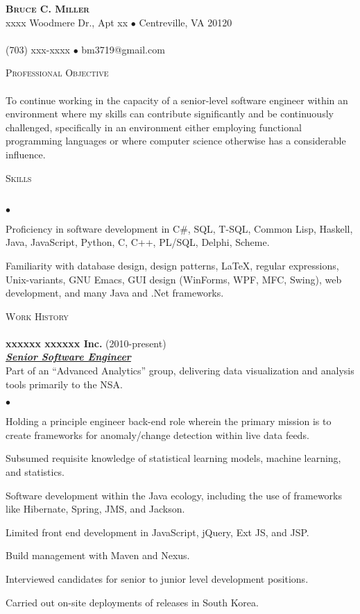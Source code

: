 \documentclass{article}
\newcommand{\lineunder}{\vspace*{-8pt} \\ \hspace*{-18pt} \hrulefill \\}
\newcommand{\header}[1]{{\hspace*{-15pt}\vspace*{7pt} \textsc{#1}} \vspace*{-7pt} \lineunder}
\newcommand{\employer}[3]{{ \textbf{#1} (#2)\\ \underline{\textbf{\emph{#3}}}\\  }}
\newcommand{\contact}[3]{
\vspace*{-8pt}
\begin{center}
{\LARGE \scshape {#1}}\\
#2 \lineunder
#3
\end{center}
\vspace*{-8pt}
}
\newenvironment{achievements}{\begin{list}{$\bullet$}{\topsep 0pt \itemsep
      -2pt}}{\vspace*{4pt}\end{list}}
\begin{document}
\small
\smallskip
\vspace*{-44pt}

\contact{\textbf{Bruce C. Miller}}
{xxxx Woodmere Dr., Apt xx $\bullet$ Centreville, VA 20120}
{(703) xxx-xxxx $\bullet$ bm3719@gmail.com}

\header{Professional Objective} To continue working in the capacity of a
senior-level software engineer within an environment where my skills can
contribute significantly and be continuously challenged, specifically in an
environment either employing functional programming languages or where computer
science otherwise has a considerable influence.
\vspace{7pt}

\header{Skills}
\begin{achievements}
\item Proficiency in software development in C\#, SQL, T-SQL, Common Lisp,
  Haskell, Java, JavaScript, Python, C, C++, PL/SQL, Delphi, Scheme.
\item Familiarity with database design, design patterns, \LaTeX, regular
  expressions, Unix-variants, GNU Emacs, GUI design (WinForms, WPF, MFC,
  Swing), web development, and many Java and .Net frameworks.
\end{achievements}

\header{Work History}

\employer{xxxxxx xxxxxx Inc.}{2010-present}{Senior Software Engineer} Part of
an ``Advanced Analytics'' group, delivering data visualization and analysis
tools primarily to the NSA.
\begin{achievements}
\item Holding a principle engineer back-end role wherein the primary mission
  is to create frameworks for anomaly/change detection within live data feeds.
\item Subsumed requisite knowledge of statistical learning models, machine
  learning, and statistics.
\item Software development within the Java ecology, including the use of
  frameworks like Hibernate, Spring, JMS, and Jackson.
\item Limited front end development in JavaScript, jQuery, Ext JS, and JSP.
\item Build management with Maven and Nexus.
\item Interviewed candidates for senior to junior level development positions.
\item Carried out on-site deployments of releases in South Korea.
\end{achievements}
\end{document}
